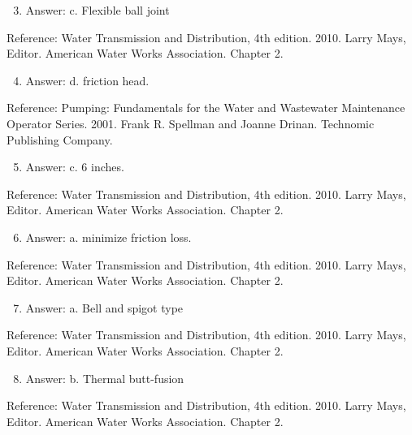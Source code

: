 \documentclass[10pt]{article}
\begin{document}
\begin{enumerate}
  \setcounter{enumi}{2}
  \item Answer: c. Flexible ball joint
\end{enumerate}

Reference: Water Transmission and Distribution, 4th edition. 2010. Larry Mays, Editor. American Water Works Association. Chapter 2.

\begin{enumerate}
  \setcounter{enumi}{3}
  \item Answer: d. friction head.
\end{enumerate}

Reference: Pumping: Fundamentals for the Water and Wastewater Maintenance Operator Series. 2001. Frank R. Spellman and Joanne Drinan. Technomic Publishing Company.

\begin{enumerate}
  \setcounter{enumi}{4}
  \item Answer: c. 6 inches.
\end{enumerate}

Reference: Water Transmission and Distribution, 4th edition. 2010. Larry Mays, Editor. American Water Works Association. Chapter 2.

\begin{enumerate}
  \setcounter{enumi}{5}
  \item Answer: a. minimize friction loss.
\end{enumerate}

Reference: Water Transmission and Distribution, 4th edition. 2010. Larry Mays, Editor. American Water Works Association. Chapter 2.

\begin{enumerate}
  \setcounter{enumi}{6}
  \item Answer: a. Bell and spigot type
\end{enumerate}

Reference: Water Transmission and Distribution, 4th edition. 2010. Larry Mays, Editor. American Water Works Association. Chapter 2.

\begin{enumerate}
  \setcounter{enumi}{7}
  \item Answer: b. Thermal butt-fusion
\end{enumerate}

Reference: Water Transmission and Distribution, 4th edition. 2010. Larry Mays, Editor. American Water Works Association. Chapter 2.
\end{document}
